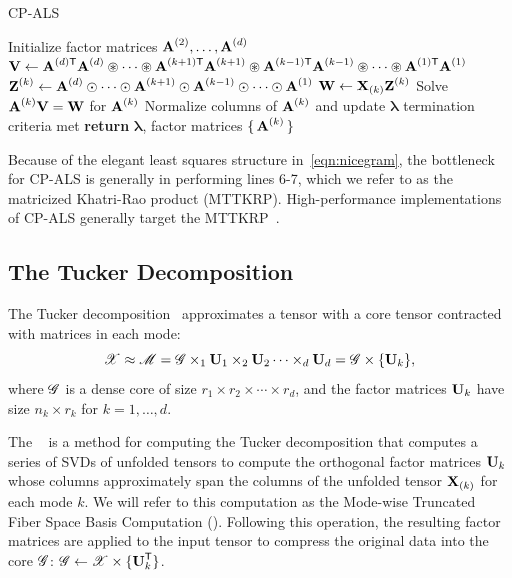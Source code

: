 \begin{algorithm}
  \caption{CP-ALS}
  \label{alg:cpals}
  \begin{algorithmic}[1]\footnotesize
    \State \label{line:cpals:init} Initialize factor matrices $\M{A}^{(2)}, \dots, \M{A}^{(d)}$
    \Repeat
      \State $\M{V} \gets \M{A}^{(d)\trans}\M{A}^{(d)} \circledast \dots \circledast \M{A}^{(k+1)\trans}\M{A}^{(k+1)} \circledast \M{A}^{(k-1)\trans}\M{A}^{(k-1)} \circledast \cdots \circledast \M{A}^{(1)\trans}\M{A}^{(1)}$\label{line:cpals:Gram}
      \State \label{line:cpals:KR} $\M{Z}^{(k)} \gets \M{A}^{(d)}\odot \cdots  \odot \M{A}^{(k+1)}\odot \M{A}^{(k-1)} \odot \cdots \odot \M{A}^{(1)}$
      \State \label{line:cpals:MTTKRP} $\M{W} \gets \M{X}_{(k)}\M{Z}^{(k)}$
      \State \label{line:cpals:solve} Solve $\M{A}^{(k)}\M{V} = \M{W}$ for $\M{A}^{(k)}$        
      \State Normalize columns of $\M{A}^{(k)}$ and update $\bm{\lambda}$
    \EndFor
    \Until termination criteria met
    \State \textbf{return} $\bm{\lambda}$, factor matrices $\set{\M{A}^{(k)}}$
    \EndFunction
  \end{algorithmic}
\end{algorithm}

Because of the elegant least squares structure in~\cref{eqn:nicegram}, the bottleneck for CP-ALS is generally in performing lines 6-7, which we refer to as the matricized Khatri-Rao product (MTTKRP). High-performance implementations of CP-ALS generally target the MTTKRP~\cite{SPLATT,dimtree,koby}. 


\subsection{The Tucker Decomposition} \label{sec:hosvd} 
The Tucker decomposition~\cite{Tu66} approximates a tensor with a core tensor contracted with 
matrices in each mode:
\begin{displaymath}
  \T{X} \approx \T{M} = \T{G} \times_1 \Mn{U}{1} \times_2 \Mn{U}{2} \cdots \times_d \Mn{U}{d} = \T{G} \times \{\Mn{U}{k}\},
\end{displaymath}
where
$\T{G}$ is a dense core of size $r_1 \times r_2 \times \cdots \times r_d$, and the factor matrices 
$\Mn{U}{k}$ have size $n_k \times r_k$ for $k=1, \dots, d$.

The \hosvd~\cite{Lathauwer00amultilinear} is a method for computing the Tucker decomposition that computes a series 
of SVDs of
unfolded tensors to compute the orthogonal factor matrices $\Mn{U}{k}$ whose 
columns approximately span the columns of the unfolded tensor $\M{X}_{(k)}$ for each mode $k$. We will refer to this computation as the Mode-wise Truncated Fiber Space Basis Computation (\MTFSBC).
Following this operation, the resulting factor matrices are applied to the input tensor to compress the original data into the core $\T{G}$: $\T{G} \gets \T{X} \times \{ \Mn{U}{k}^\trans \}$. 


